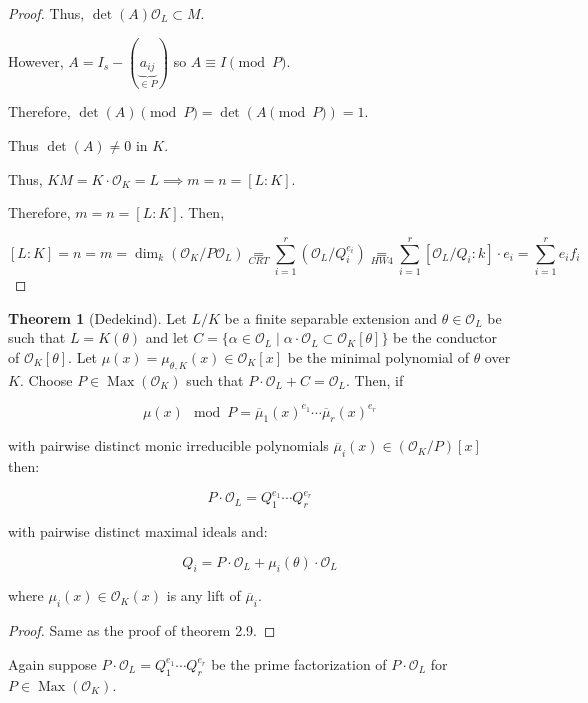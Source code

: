 \documentclass[openany]{amsbook}
\numberwithin{section}{chapter}
\theoremstyle{definition}
\newtheorem{theorem}{Theorem}[chapter]
\begin{document}
\begin{proof}
    Thus, \(\det (A) \mathcal{O}_L \subset M\). 

    However, \(A = I_s - (\underbrace{a_{ij}}_{\in P})\) so \(A \equiv I \pmod P\).

    Therefore, \(\det(A) \pmod P = \det(A\pmod P) = 1\).

    Thus \(\det (A) \neq 0\) in \(K\).

    Thus, \(KM = K \cdot \mathcal{O}_K = L \implies m = n = [L:K]\). 

    Therefore, \(m=n=[L:K]\). Then, 
    
    \[
        [L:K]=n=m=\dim_k(\mathcal{O}_K / P \mathcal{O}_L) \underset{CRT}{=} \sum_{i=1}^r (\mathcal{O}_L / Q_i^{e_i}) \underset{HW4}{=} \sum_{i=1}^r [\mathcal{O}_L / Q_i : k]\cdot e_i = \sum_{i=1}^r e_i f_i
    \]
    

\end{proof}

\begin{theorem}
    [Dedekind] Let \(L / K\) be a finite separable extension and \(\theta \in \mathcal{O}_L\) be such that \(L = K(\theta)\) and let \(C = \{ \alpha \in \mathcal{O}_L \mid \alpha \cdot \mathcal{O}_L \subset \mathcal{O}_K [\theta] \} \) be the conductor of \(\mathcal{O}_K[\theta]\). Let \(\mu(x)=\mu_{\theta ,K}(x) \in \mathcal{O}_K[x]\) be the minimal polynomial of \(\theta\) over \(K\). Choose \(P \in \operatorname{Max}(\mathcal{O}_K)\) such that \(P \cdot \mathcal{O}_L + C = \mathcal{O}_L\). Then, if 

    \[
        \mu (x) \mod P = \overline{\mu}_1(x)^{e_1} \cdots \overline{\mu}_r(x)^{e_r}
    \]

    with pairwise distinct monic irreducible polynomials \(\overline{\mu }_i (x) \in (\mathcal{O}_K / P) [x]\) then: 
    
    \[
        P\cdot \mathcal{O}_L = Q_1^{e_1} \cdots Q_r^{e_r}
    \]
    
    with pairwise distinct maximal ideals and:

    \[
        Q_i = P\cdot \mathcal{O}_L + \mu_i(\theta)\cdot \mathcal{O}_L
    \]

    where \(\mu_i(x) \in \mathcal{O}_K(x)\) is any lift of \(\overline{\mu}_i\).
\end{theorem}

\begin{proof}
    Same as the proof of theorem 2.9.
\end{proof}

Again suppose \(P\cdot \mathcal{O}_L = Q_1^{e_1} \cdots Q_r^{e_r}\) be the prime factorization of \(P\cdot \mathcal{O}_L\) for \(P\in \operatorname{Max}(\mathcal{O}_K)\). 
\end{document}
